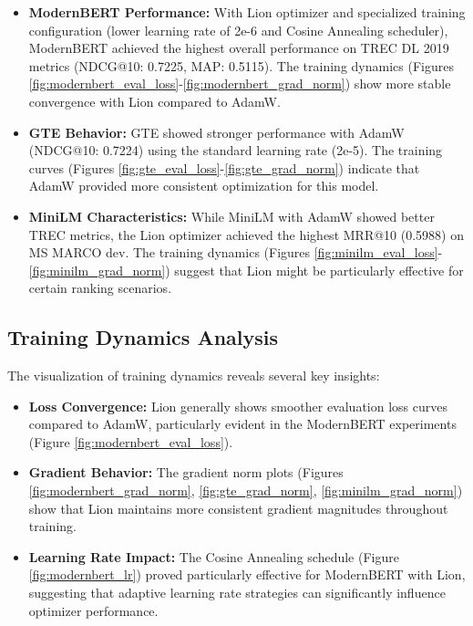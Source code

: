\begin{itemize}
    \item \textbf{ModernBERT Performance:} With Lion optimizer and specialized training configuration (lower learning rate of 2e-6 and Cosine Annealing scheduler), ModernBERT achieved the highest overall performance on TREC DL 2019 metrics (NDCG@10: 0.7225, MAP: 0.5115). The training dynamics (Figures \ref{fig:modernbert_eval_loss}-\ref{fig:modernbert_grad_norm}) show more stable convergence with Lion compared to AdamW.
    
    \item \textbf{GTE Behavior:} GTE showed stronger performance with AdamW (NDCG@10: 0.7224) using the standard learning rate (2e-5). The training curves (Figures \ref{fig:gte_eval_loss}-\ref{fig:gte_grad_norm}) indicate that AdamW provided more consistent optimization for this model.
    
    \item \textbf{MiniLM Characteristics:} While MiniLM with AdamW showed better TREC metrics, the Lion optimizer achieved the highest MRR@10 (0.5988) on MS MARCO dev. The training dynamics (Figures \ref{fig:minilm_eval_loss}-\ref{fig:minilm_grad_norm}) suggest that Lion might be particularly effective for certain ranking scenarios.
\end{itemize}

\subsection{Training Dynamics Analysis}

The visualization of training dynamics reveals several key insights:

\begin{itemize}
    \item \textbf{Loss Convergence:} Lion generally shows smoother evaluation loss curves compared to AdamW, particularly evident in the ModernBERT experiments (Figure \ref{fig:modernbert_eval_loss}).
    
    \item \textbf{Gradient Behavior:} The gradient norm plots (Figures \ref{fig:modernbert_grad_norm}, \ref{fig:gte_grad_norm}, \ref{fig:minilm_grad_norm}) show that Lion maintains more consistent gradient magnitudes throughout training.
    
    \item \textbf{Learning Rate Impact:} The Cosine Annealing schedule (Figure \ref{fig:modernbert_lr}) proved particularly effective for ModernBERT with Lion, suggesting that adaptive learning rate strategies can significantly influence optimizer performance.
\end{itemize}

